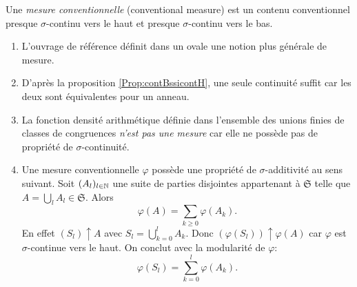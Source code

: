 \begin{defi}
Une \emph{mesure conventionnelle} (conventional measure) est un contenu conventionnel presque $\sigma$-continu vers le haut et presque $\sigma$-continu vers le bas.
\end{defi}

\begin{rems}
 \begin{enumerate}
  \item L'ouvrage de référence définit dans un ovale une notion plus générale de mesure.
  \item D'après la proposition \ref{Prop:contBssicontH}, une seule  continuité suffit car les deux sont équivalentes pour un anneau.
  \item La fonction densité arithmétique définie dans l'ensemble des unions finies de classes de congruences \emph{n'est pas une mesure} car elle ne possède pas de propriété de $\sigma$-continuité.
  \item Une mesure conventionnelle $\varphi$ possède une propriété de $\sigma$-additivité au sens suivant.\newline
  Soit $(A_l)_{l \in \mathbb{N}}$ une suite de parties disjointes appartenant à $\mathfrak{S}$ telle que $A = \bigcup_l A_l \in \mathfrak{S}$. Alors
  \begin{displaymath}
   \varphi(A) = \sum_{k\geq 0} \varphi(A_k).
  \end{displaymath}
En effet $(S_l)\uparrow A$ avec $S_l = \bigcup_{k=0}^l A_k$. Donc $(\varphi(S_l))\uparrow \varphi (A)$ car $\varphi$ est $\sigma$-continue vers le haut. On conclut avec la modularité de $\varphi$:
\begin{displaymath}
 \varphi(S_l) = \sum_{k=0}^{l} \varphi(A_k).
\end{displaymath}
 \end{enumerate}
\end{rems}

